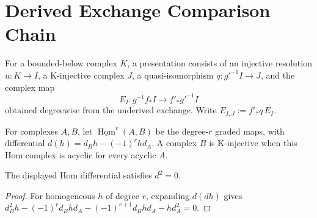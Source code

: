 \section*{Derived Exchange Comparison Chain}

\begin{definition}
\label{def:weil-pbc-derived-exchange-presentation-v5}
For a bounded-below complex $K$, a presentation consists of an injective
resolution $u:K\to I$, a K-injective complex $J$, a quasi-isomorphism
$q:g'^{-1}I\to J$, and the complex map
\[
 E_I:g^{-1}f_*I\longrightarrow f'_*g'^{-1}I
\]
obtained degreewise from the underived exchange.  Write
$E_{I,J}:=f'_*q\,E_I$.
\end{definition}

\begin{definition}
\label{def:weil-pbc-derived-exchange-hom-test-v5}
For complexes $A,B$, let $\underline{\operatorname{Hom}}^r(A,B)$ be the
degree-$r$ graded maps, with differential $d(h)=d_Bh-(-1)^rh d_A$.
A complex $B$ is K-injective when this Hom complex is acyclic for every
acyclic $A$.
\end{definition}

\begin{lemma}
\label{lemma:weil-pbc-derived-exchange-hom-differential-v5}
The displayed Hom differential satisfies $d^2=0$.
\end{lemma}
\begin{proof}
For homogeneous $h$ of degree $r$, expanding $d(dh)$ gives
$d_B^2h-(-1)^rd_Bhd_A-(-1)^{r+1}d_Bhd_A-hd_A^2=0$.
\end{proof}

